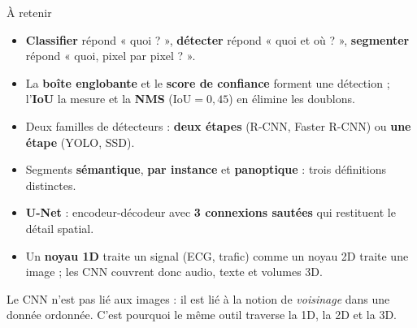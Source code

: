 \begin{frame}{À retenir}
\begin{kbox}
\begin{itemize}
  \item \textbf{Classifier} répond « quoi ? », \textbf{détecter} répond
  « quoi et où ? », \textbf{segmenter} répond « quoi, pixel par pixel ? ».
  \item La \textbf{boîte englobante} et le \textbf{score de confiance}
  forment une détection ; l'\textbf{IoU} la mesure et la \textbf{NMS}
  ($\mathrm{IoU}=0{,}45$) en élimine les doublons.
  \item Deux familles de détecteurs : \textbf{deux étapes}
  (R-CNN, Faster R-CNN) ou \textbf{une étape} (YOLO, SSD).
  \item Segments \textbf{sémantique}, \textbf{par instance} et
  \textbf{panoptique} : trois définitions distinctes.
  \item \textbf{U-Net} : encodeur-décodeur avec \textbf{3 connexions sautées}
  qui restituent le détail spatial.
  \item Un \textbf{noyau 1D} traite un signal (ECG, trafic) comme un noyau 2D
  traite une image ; les CNN couvrent donc audio, texte et volumes 3D.
\end{itemize}
\end{kbox}
\begin{wbox}
Le CNN n'est pas lié aux images : il est lié à la notion de \emph{voisinage}
dans une donnée ordonnée. C'est pourquoi le même outil traverse la 1D, la 2D
et la 3D.
\end{wbox}
\end{frame}

